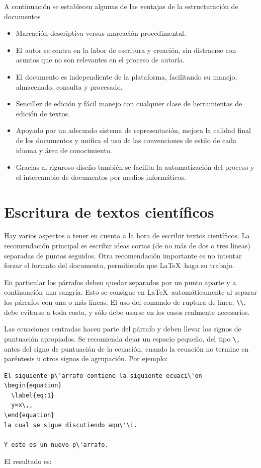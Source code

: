 \documentclass{article}
\begin{document}
A continuación se establecen algunas de las ventajas de la estructuración de documentos
  \begin{itemize}
  \item   Marcación descriptiva versus marcación procedimental.
  \item   El autor se centra en la labor de escritura y creación, sin distraerse con asuntos que no son relevantes en el proceso de autoría.
  \item  El documento es independiente de la plataforma, facilitando su manejo, almacenado, consulta y procesado.
  \item   Sencillez de edición y fácil manejo con cualquier clase de herramientas de edición de textos.
  \item   Apoyado por un adecuado sistema de representación, mejora la calidad final de los documentos y unifica el uso de las convenciones de estilo de cada idioma y área de conocimiento.
  \item   Gracias al riguroso diseño también se facilita la automatización del proceso y el intercambio de documentos por medios informáticos. 
  \end{itemize}
  
\section{Escritura de textos científicos}  
Hay varios aspectos a tener en cuenta a la hora de escribir textos científicos. La recomendación principal es escribir ideas cortas (de no más de dos o tres líneas) separadas de puntos seguidos. Otra recomendación importante es no intentar forzar el formato del documento, permitiendo que \LaTeX\ haga su trabajo.

En particular los párrafos deben quedar separados por un punto aparte y a continuación una sangría. %
Esto se consigue en \LaTeX\ automáticamente al separar los párrafos con una o más líneas. El uso del comando de ruptura de línea: \verb|\\|, debe evitarse a toda costa, y sólo debe usarse en los casos realmente necesarios.  


Las ecuaciones centradas hacen parte del párrafo y deben llevar los signos de puntuación apropiados. Se recomienda dejar un espacio pequeño, del tipo \verb|\,| antes del signo de puntuación de la ecuación, cuando la ecuación no termine en paréntesis u otros signos de agrupación. Por ejemplo:
\begin{lstlisting}
El siguiente p\'arrafo contiene la siguiente ecuaci\'on
\begin{equation}
  \label{eq:1}
  y=x\,,
\end{equation}
la cual se sigue discutiendo aqu\'\i.

Y este es un nuevo p\'arrafo.
\end{lstlisting}
El resultado es:
\end{document}
